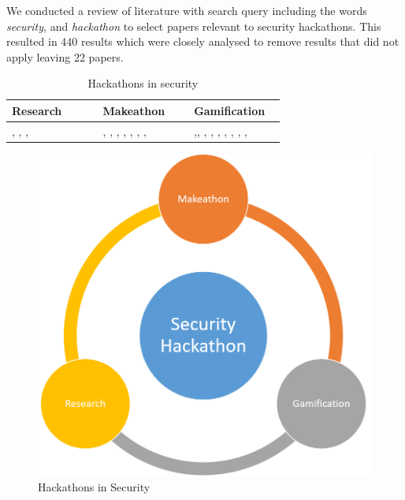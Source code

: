 We conducted a review of literature with search query including the words \textit{security}, and \textit{hackathon} to select papers relevant to security hackathons. This resulted in 440 results which were closely analysed to remove results that did not apply leaving 22 papers.

\begin{table}[h]
    \centering
    \caption{Hackathons in security}
    \label{tab:hackinsecurity}
    \begin{tabular}{|p{0.3\linewidth}|p{0.3\linewidth}|p{0.3\linewidth}|} \hline
        Research & Makeathon & Gamification \\ \hline
\cite{kharchenko2016university}, \cite{foley2018science}, \cite{key2017automotive}, \cite{lin2019using} & \cite{kharchenko2016university} \cite{dainotti2018bgp}, \cite{melon2018eve}, \cite{starov2015hacking}, \cite{sherman2019cats}, \cite{weiss2015teaching}, \cite{abdullah2015stimulating}, \cite{balcerzak2017press}, \cite{uys2019hackathons} & \cite{sherman2019cats},\cite{boopathi2015learning}, \cite{flood2012black}, \cite{vykopal2017lessons}, \cite{ricci2016cybersecurity}, \cite{davis2014fun}, \cite{lorenz2019cybersecurity}, \cite{katsantonis2017conceptual}, \cite{coull2017gamification}, \cite{dupuisevaluating}\\ \hline
    \end{tabular}
\end{table}

\begin{figure}[h]
  \centering
  \includegraphics[width=0.75\linewidth]{Hackcycle.png}
  \caption{Hackathons in Security} \label{Fig:hackcycle} 
\end{figure}

